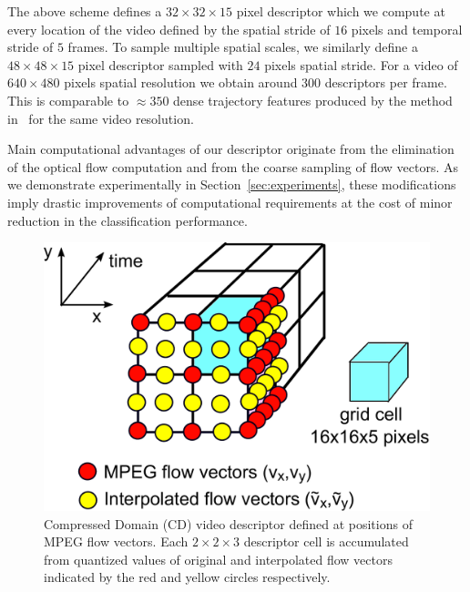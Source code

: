 \documentclass[10pt,twocolumn,letterpaper]{article}
\begin{document}
The above scheme defines a $32\times32\times15$ pixel descriptor which we compute at every location of the video defined by the spatial stride of $16$ pixels and temporal stride of $5$ frames. To sample multiple spatial scales, we similarly define a $48\times48\times15$ pixel descriptor sampled with $24$ pixels spatial stride. For a video of $640\times480$ pixels spatial resolution we obtain around 300 descriptors per frame. This is comparable to $\approx350$ dense trajectory features produced by the method in~\cite{Wang12} for the same video resolution.

Main computational advantages of our descriptor originate from the elimination of the optical flow computation and from the coarse sampling of flow vectors. As we demonstrate experimentally in Section~\ref{sec:experiments}, these modifications imply drastic improvements of computational requirements at the cost of minor reduction in the classification performance. 


\begin{figure}
\begin{center}
\includegraphics[width=.7\linewidth]{figures/CD-descriptor2.pdf}
\caption{Compressed Domain (CD) video descriptor defined at positions of MPEG flow vectors. Each $2\times2\times3$ descriptor cell is accumulated from quantized values of original and interpolated flow vectors indicated by the red and yellow circles respectively.\vspace{-.7cm}}
\label{fig:CDdescriptor}
\end{center}
\end{figure}
\end{document}
